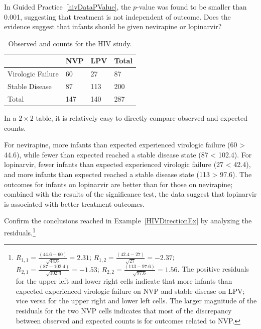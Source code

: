 \begin{example}{In Guided Practice~\ref{hivDataPValue}, the $p$-value was found to be smaller than 0.001, suggesting that treatment is not independent of outcome. Does the evidence suggest that infants should be given nevirapine or lopinarvir?

\begin{table}[h]
	\centering
	\begin{tabular}{l | l l | l}
		\hline
		& NVP & LPV & Total \\
		\hline
		Virologic Failure & 60 \highlightO{44.6} & 27 \highlightO{42.4} & 87 \\
		Stable Disease & 87 \highlightO{102.4} & 113 \highlightO{97.6}& 200 \\	
		\hline
		Total & 147 & 140 & 287 \\
		\hline
	\end{tabular}
	\caption{Observed and  counts for the HIV study.}
\end{table}			
		
} 
	
In a $2 \times 2$ table, it is relatively easy to directly compare observed and expected counts. 

For nevirapine, more infants than expected experienced virologic failure (60 > 44.6), while fewer than expected reached a stable disease state (87 < 102.4). For lopinarvir, fewer infants than expected experienced virologic failure (27 < 42.4), and more infants than expected reached a stable disease state (113 > 97.6). The outcomes for infants on lopinarvir are better than for those on nevirapine; combined with the results of the significance test, the data suggest that lopinarvir is associated with better treatment outcomes.
\label{HIVDirectionEx}	
\end{example}

\begin{exercise} Confirm the conclusions reached in Example~\ref{HIVDirectionEx} by analyzing the residuals.\footnote{$R_{1, 1} = \frac{(44.6-60)}{\sqrt{44.6}} = 2.31$; $R_{1, 2} = \frac{(42.4-27)}{\sqrt{27}} = -2.37$; $R_{2, 1} = \frac{(87-102.4)}{\sqrt{102.4}} = -1.53$; $R_{2, 2} = \frac{(113-97.6)}{\sqrt{97.6}} = 1.56$. The positive residuals for the upper left and lower right cells indicate that more infants than expected experienced virologic failure on NVP and stable disease on LPV; vice versa for the upper right and lower left cells. The larger magnitude of the residuals for the two NVP cells indicates that most of the discrepancy between observed and expected counts is for outcomes related to NVP.}
\end{exercise}

